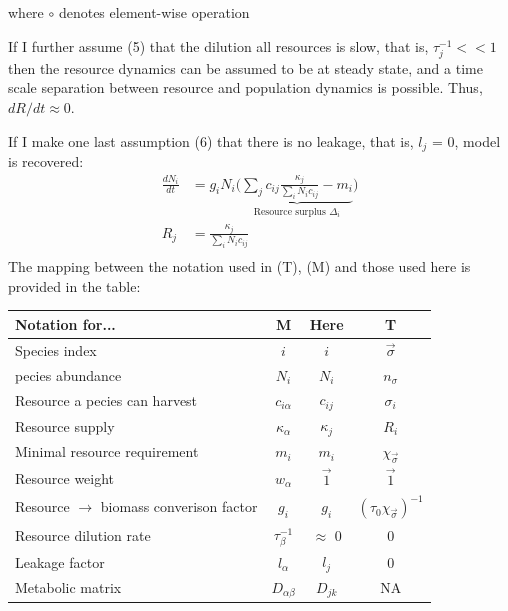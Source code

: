 \documentclass[12pt]{article}
\begin{document}
	where $ \circ $ denotes element-wise  operation\par
	If I further assume (5) that the dilution all resources is slow, that is, $ \tau_j^{-1} << 1$ then the resource dynamics can be assumed to be at steady state, and a time scale separation between resource and population dynamics is possible. Thus, $ dR/dt \approx 0 $.\par
	If I make one last assumption (6) that there is no leakage, that is, $ l_j $ = 0, \cite{Tikhonov2016} model is recovered:
	\begin{equation}\label{Tikhonov_model}
		\begin{aligned}
					\frac{dN_i}{dt} &= g_iN_i\Big(\underbrace{\sum_j c_{ij}\frac{\kappa_j}{\sum_iN_ic_{ij}} - m_i}_{\text{Resource surplus }\Delta_i}\Big)\\
					R_j &= \frac{\kappa_j}{\sum_iN_ic_{ij}}\\
		\end{aligned}
	\end{equation} 
	The mapping between the notation used in \cite{Tikhonov2016} (T), \cite{Marsland2019} (M) and those used here is provided in the table:\\
	\begin{center}
		\begin{tabular}{ |l|c|c|c| } 
			\hline
			Notation for... & M & Here & T \\ 
			\hline
			Species index & $ i $ & $ i $ & $\vec{\sigma}$ \\ 
			pecies abundance & $ N_i $ & $ N_i $ & $ n_{\sigma} $ \\ 
			Resource a pecies can harvest & $ c_{i\alpha} $ & $ c_{ij} $ & $ \sigma_i $ \\ 
			Resource supply & $ \kappa_{\alpha}$ & $ \kappa_j $ & $ R_i $ \\ 
			Minimal resource requirement & $ m_i $ & $ m_i $ & $ \chi_{\vec{\sigma}} $ \\ 
			Resource weight & $ w_{\alpha} $ & $ \vec{1} $ & $\vec{1}$ \\ 
			Resource $ \rightarrow $ biomass converison factor & $ g_i $ & $ g_i $ & $ (\tau_0\chi_{\vec{\sigma}})^{-1} $ \\ 
			Resource dilution rate & $ \tau_{\beta}^{-1} $ & $ \approx $ 0 & 0 \\ 
			Leakage factor & $ l_{\alpha} $ & $ l_j $ & 0 \\ 
			Metabolic matrix & $ D_{\alpha\beta} $ & $ D_{jk} $ & NA \\ 
			\hline
		\end{tabular}
	\end{center}
	
\end{document}
